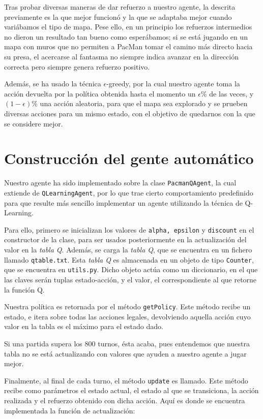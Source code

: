 \documentclass[12pt]{article}
\begin{document}
Tras probar diversas maneras de dar refuerzo a nuestro agente, la descrita previamente es la que mejor funcionó y la que se adaptaba mejor cuando variábamos el tipo de mapa. Pese ello, en un principio los refuerzos intermedios no dieron un resultado tan bueno como esperábamos; si se está jugando en un mapa con muros que no permiten a PacMan tomar el camino más directo hacia su presa, el acercarse al fantasma no siempre indica avanzar en la dirección correcta pero siempre genera refuerzo positivo.

Además, se ha usado la técnica $\epsilon$-greedy, por la cual nuestro agente toma la acción devuelta por la política obtenida hasta el momento un $\epsilon\%$ de las veces, y $(1-\epsilon)\%$ una acción aleatoria, para que el mapa sea explorado y se prueben diversas acciones para un mismo estado, con el objetivo de quedarnos con la que se considere mejor.

\newpage
\section{Construcción del gente automático}

Nuestro agente ha sido implementado sobre la clase \texttt{PacmanQAgent}, la cual extiende de \texttt{QLearningAgent}, por lo que trae cierto comportamiento predefinido para que resulte más sencillo implementar un agente utilizando la técnica de Q-Learning.

Para ello, primero se inicializan los valores de \texttt{alpha, epsilon} y \texttt{discount} en el constructor de la clase, para ser usados posteriormente en la actualización del valor en la \textit{tabla Q}. Además, se carga la \textit{tabla Q}, que se encuentra en un fichero llamado \texttt{qtable.txt}. Esta \textit{tabla Q} es almacenada en un objeto de tipo \texttt{Counter}, que se encuentra en \texttt{utils.py}. Dicho objeto actúa como un diccionario, en el que las claves serán tuplas estado-acción, y el valor, el correspondiente al que retorne la función Q.

Nuestra política es retornada por el método \texttt{getPolicy}. Este método recibe un estado, e itera sobre todas las acciones legales, devolviendo aquella acción cuyo valor en la tabla es el máximo para el estado dado.

Si una partida supera los 800 turnos, ésta acaba, pues entendemos que nuestra tabla no se está actualizando con valores que ayuden a nuestro agente a jugar mejor.

Finalmente, al final de cada turno, el método \texttt{update} es llamado. Este método recibe como parámetros el estado actual, el estado al que se transiciona, la acción realizada y el refuerzo obtenido con dicha acción. Aquí es donde se encuentra implementada la función de actualización:
\end{document}
